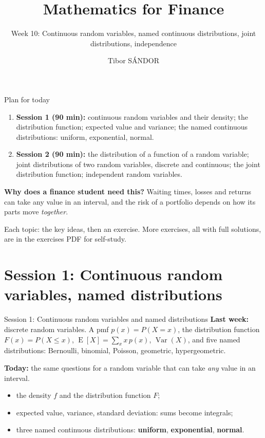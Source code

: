 \documentclass[aspectratio=169,11pt,usepdftitle=false]{beamer}
\title[Mathematics for Finance]{Mathematics for Finance}
\author{Tibor SÁNDOR}
\subtitle{Week 10: Continuous random variables, named continuous
  distributions, joint distributions, independence}
\institute{Corvinus University of Budapest\\[2pt]
  \href{mailto:\myemail}{\texttt{\myemail}}}
\newcommand{\E}{\operatorname{E}}
\newcommand{\Var}{\operatorname{Var}}
\begin{document}
\begin{frame}
  \titlepage
\end{frame}

\begin{frame}{Plan for today}
  \begin{enumerate}
    \item \textbf{Session 1 (90 min):} continuous random variables and
          their density; the distribution function; expected value and
          variance; the named continuous distributions: uniform,
          exponential, normal.
    \item \textbf{Session 2 (90 min):} the distribution of a function of a
          random variable; joint distributions of two random variables,
          discrete and continuous; the joint distribution function;
          independent random variables.
  \end{enumerate}
  \vspace{.3cm}
  \textbf{Why does a finance student need this?} Waiting times, losses and
  returns can take any value in an interval, and the risk of a portfolio
  depends on how its parts move \emph{together}.
  \vspace{.2cm}

  Each topic: the key ideas, then an exercise. More exercises, all with
  full solutions, are in the exercises PDF for self-study.
\end{frame}

\section{Session 1: Continuous random variables, named distributions}

\begin{frame}{Session 1: Continuous random variables and named
    distributions}
  \textbf{Last week:} discrete random variables. A pmf $p(x)=P(X=x)$, the
  distribution function $F(x)=P(X\le x)$, $\E[X]=\sum_x x\,p(x)$,
  $\Var(X)$, and five named distributions: Bernoulli, binomial, Poisson,
  geometric, hypergeometric.
  \vspace{3mm}

  \textbf{Today:} the same questions for a random variable that can take
  \emph{any} value in an interval.
  \begin{itemize}
    \item the density $f$ and the distribution function $F$;
    \item expected value, variance, standard deviation: sums become
          integrals;
    \item three named continuous distributions: \textbf{uniform},
          \textbf{exponential}, \textbf{normal}.
  \end{itemize}
\end{frame}
\end{document}
